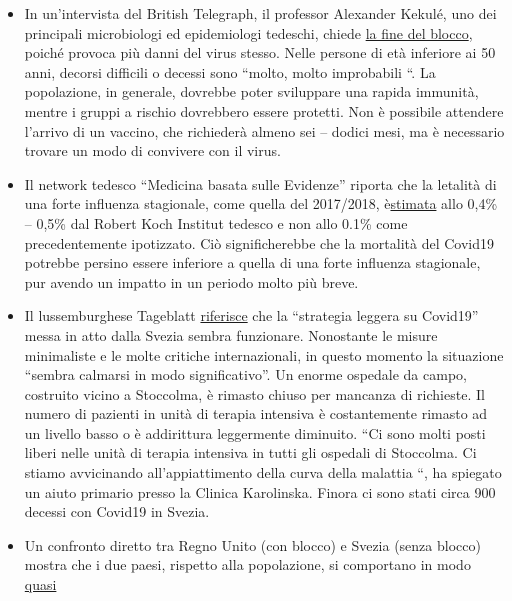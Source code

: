 \begin{itemize}
\tightlist
\item
  In un'intervista del British Telegraph, il professor Alexander Kekulé,
  uno dei principali microbiologi ed epidemiologi tedeschi, chiede
  \href{https://www.telegraph.co.uk/news/2020/04/11/german-scientist-predicted-european-epidemic-calls-end-lockdown/}{la
  fine del blocco}, poiché provoca più danni del virus stesso. Nelle
  persone di età inferiore ai 50 anni, decorsi difficili o decessi sono
  ``molto, molto improbabili ``. La popolazione, in generale, dovrebbe
  poter sviluppare una rapida immunità, mentre i gruppi a rischio
  dovrebbero essere protetti. Non è possibile attendere l'arrivo di un
  vaccino, che richiederà almeno sei -- dodici mesi, ma è necessario
  trovare un modo di convivere con il virus.
\item
  Il network tedesco ``Medicina basata sulle Evidenze'' riporta che la
  letalità di una forte influenza stagionale, come quella del 2017/2018,
  è\href{https://www.ebm-netzwerk.de/en/publications/covid-19}{stimata}
  allo 0,4\% -- 0,5\% dal Robert Koch Institut tedesco e non allo 0.1\%
  come precedentemente ipotizzato. Ciò significherebbe che la mortalità
  del Covid19 potrebbe persino essere inferiore a quella di una forte
  influenza stagionale, pur avendo un impatto in un periodo molto più
  breve.
\item
  Il lussemburghese Tageblatt
  \href{https://swprs.files.wordpress.com/2020/04/volksblatt_schweden_corona_20200414_18.pdf}{riferisce}
  che la ``strategia leggera su Covid19'' messa in atto dalla Svezia
  sembra funzionare. Nonostante le misure minimaliste e le molte
  critiche internazionali, in questo momento la situazione ``sembra
  calmarsi in modo significativo''. Un enorme ospedale da campo,
  costruito vicino a Stoccolma, è rimasto chiuso per mancanza di
  richieste. Il numero di pazienti in unità di terapia intensiva è
  costantemente rimasto ad un livello basso o è addirittura leggermente
  diminuito. ``Ci sono molti posti liberi nelle unità di terapia
  intensiva in tutti gli ospedali di Stoccolma. Ci stiamo avvicinando
  all'appiattimento della curva della malattia ``, ha spiegato un aiuto
  primario presso la Clinica Karolinska. Finora ci sono stati circa 900
  decessi con Covid19 in Svezia.
\item
  Un confronto diretto tra Regno Unito (con blocco) e Svezia (senza
  blocco) mostra che i due paesi, rispetto alla popolazione, si
  comportano in modo
  \href{http://www.theblogmire.com/a-comparison-of-lockdown-uk-with-non-lockdown-sweden/}{quasi
}
\end{itemize}
